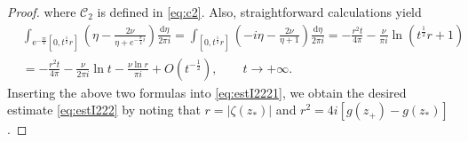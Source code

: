 \documentclass[11pt,a4paper]{article}
\numberwithin{equation}{section}
\def\arg {\mathop{\rm arg}\nolimits}
\begin{document}
\begin{proof}
where $\mathcal{C}_2$ is defined in \eqref{eq:c2}. Also, straightforward calculations yield
\begin{align*}
&\int_{\mathrm{e}^{-\frac{\pi i}{4}}[0,t^{\frac{1}{2}}r]} \left(\eta-\frac{2\nu}{\eta+e^{-\frac{\pi}{4}i}}\right)
\frac{\mathrm{d}\eta}{2\pi i}
=\int_{[0,t^{\frac{1}{2}}r]}\left(-i\eta-\frac{2\nu}{\eta+1}\right)
\frac{\mathrm{d}\eta}{2\pi i}
=-\frac{r^2t}{4\pi }-\frac{\nu}{\pi i}\ln\left(t^{\frac{1}{2}}r+1\right)\\
&=-\frac{r^2t}{4\pi }-\frac{\nu}{2\pi i}\ln{t}-\frac{\nu\ln{r}}{\pi i}+O\left(t^{-\frac{1}{2}}\right),\qquad t\to+\infty.
\end{align*}
Inserting the above two formulas into \eqref{eq:estI2221}, we obtain the desired estimate \eqref{eq:estI222} by noting that $r=|\zeta(z_*)|$ and $r^2=4i[g(z_+)-g(z_*)]$.
\end{proof}
%
%
%
\end{document}
